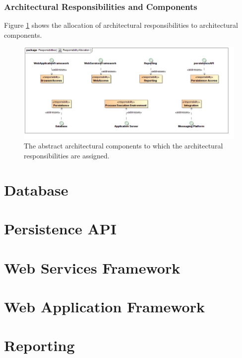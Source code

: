 \subsubsection{Architectural Responsibilities and Components}
Figure \ref{fig:architectureResponsibilityAllocation} shows the allocation of
architectural responsibilities to architectural components. 
\begin{figure}[H]
	\begin{center}
	\includegraphics[scale=0.5]{../Diagrams and Charts/Architecture/ResponsibilityAllocation.jpg}
	\caption{The abstract architectural components to which the architectural responsibilities are
assigned.}
	\end{center}
	\label{fig:architectureResponsibilityAllocation}
\end{figure}

\section{Database}


\section{Persistence API}


\section{Web Services Framework}


\section{Web Application Framework}


\section{Reporting}

